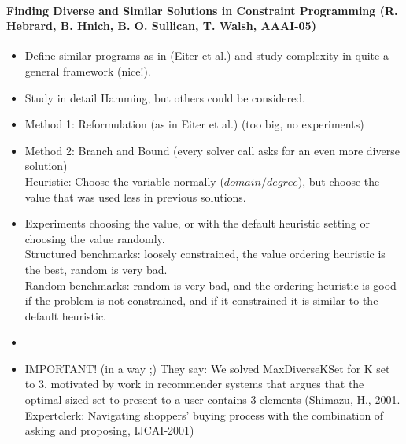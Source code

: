 
\newpage
\paragraph{Finding Diverse and Similar Solutions in Constraint Programming (R. Hebrard, B. Hnich, B. O. Sullican, T. Walsh, AAAI-05)}

\begin{itemize}
\item
    Define similar programs as in (Eiter et al.) and study complexity in quite a general framework (nice!).
\item
    Study in detail Hamming, but others could be considered.
\item
    Method 1: Reformulation (as in Eiter et al.) (too big, no experiments)
\item
    Method 2: Branch and Bound (every solver call asks for an even more diverse solution)
    \\
    Heuristic:
    Choose the variable normally ($domain/degree$), 
    but choose the value that was used less in previous solutions.
    \\
\item
    Experiments choosing the value, or with the default heuristic setting or choosing the value randomly.
    \\
    Structured benchmarks: loosely constrained, the value ordering heuristic is the best, random is very bad.
    \\
    Random benchmarks: random is very bad, and the ordering heuristic is good if the problem is not constrained, 
    and if it constrained it is similar to the default heuristic.
\item
\item
    IMPORTANT! (in a way ;) They say: We solved MaxDiverseKSet for K set to 3, 
    motivated by work in recommender systems that argues that the optimal sized set to present to a user contains 3 elements
    (Shimazu, H., 2001. Expertclerk: Navigating shoppers' buying process with the combination of asking and proposing, IJCAI-2001)
\end{itemize}



